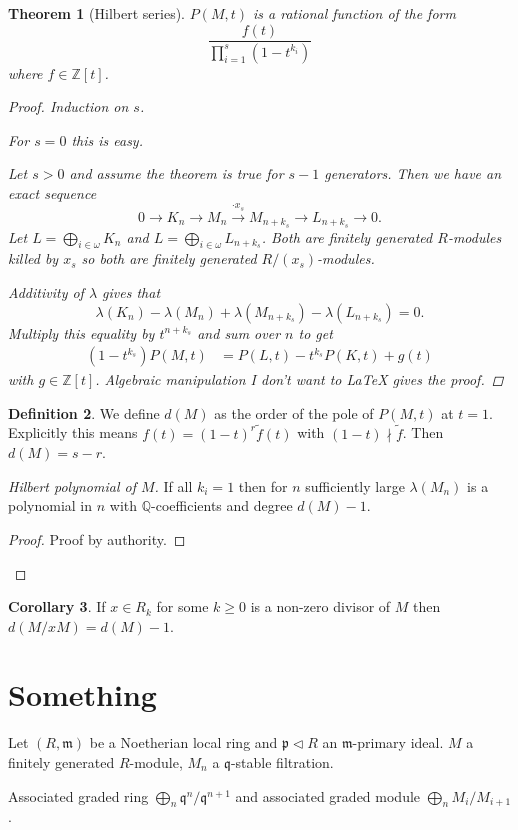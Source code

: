 \documentclass{article}
\newcommand{\Z}{\mathbb{Z}}
\newcommand{\Q}{\mathbb{Q}}
\newcommand{\maxid}{\mathfrak{m}}
\newcommand{\primeid}{\mathfrak{p}}
\newcommand{\primeidd}{\mathfrak{q}}
\newcommand{\ideal}{\triangleleft}
\newtheorem{theorem}{Theorem}[section]
\theoremstyle{definition}
\newtheorem{definition}[theorem]{Definition}
\newtheorem{corollary}[theorem]{Corollary}
\begin{document}
\begin{theorem}[Hilbert series]
    \(P(M,t)\) is a rational function of the form
    \[
        \frac{f(t)}{\prod_{i=1}^{s}(1-t^{k_{i}})}
    \]
    where \(f\in\Z[t]\).

    \begin{proof}
        Induction on \(s\).

        For \(s=0\) this is easy.

        Let \(s>0\) and assume the theorem is true for \(s-1\) generators.
        Then we have an exact sequence
        \[
            0\to K_{n}\to M_{n}\stackrel{\cdot x_{s}}{\to}M_{n+k_{s}}\to L_{n+k_{s}}\to 0.
        \]
        Let \(L=\bigoplus_{i\in\omega}K_{n}\) and
        \(L=\bigoplus_{i\in\omega}L_{n+k_{s}}\). Both are finitely generated
        \(R\)-modules killed by \(x_{s}\) so both are finitely generated
        \(R/(x_{s})\)-modules.

        Additivity of \(\lambda\) gives that
        \[
            \lambda(K_{n})-\lambda(M_{n})+\lambda(M_{n+k_{s}})-\lambda(L_{n+k_{s}})=0.
        \]
        Multiply this equality by \(t^{n+k_{s}}\) and sum over \(n\) to get
        \begin{align*}
            (1-t^{k_{s}})P(M,t) & =P(L,t)-t^{k_{s}}P(K,t)+g(t)
        \end{align*}
        with \(g\in\Z[t]\). Algebraic manipulation I don't want to \LaTeX{}
        gives the proof.
    \end{proof}
\end{theorem}

\begin{definition}
    We define \(d(M)\) as the order of the pole of \(P(M,t)\) at \(t=1\).
    Explicitly this means \(f(t)=(1-t)^{r}\tilde{f}(t)\) with
    \((1-t)\nmid\tilde{f}\). Then \(d(M)=s-r\).
\end{definition}

\begin{proof}[Hilbert polynomial of \(M\)]
    If all \(k_{i}=1\) then for \(n\) sufficiently large \(\lambda(M_{n})\) is a
    polynomial in \(n\) with \(\Q\)-coefficients and degree \(d(M)-1\).

    \begin{proof}
        Proof by authority.
    \end{proof}
\end{proof}

\begin{corollary}
    If \(x\in R_{k}\) for some \(k\geq 0\) is a non-zero divisor of \(M\) then
    \(d(M/xM)=d(M)-1\).
\end{corollary}

\section{Something}
Let \((R,\maxid)\) be a Noetherian local ring and \(\primeid\ideal R\) an
\(\maxid\)-primary ideal. \(M\) a finitely generated \(R\)-module, \(M_{n}\) a
\(\primeidd\)-stable filtration.

Associated graded ring \(\bigoplus_{n}\primeidd^{n}/\primeidd^{n+1}\) and
associated graded module \(\bigoplus_{n}M_{i}/M_{i+1}\).
\end{document}
